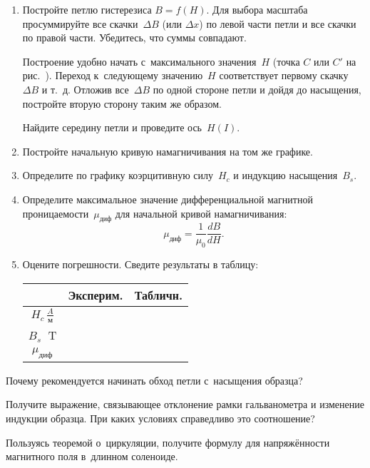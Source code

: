 \begin{lab:task}
\begin{enumerate}
		\item Постройте петлю гистерезиса $B=f(H)$. Для выбора масштаба просуммируйте все скачки~$\Delta B$ (или $\Delta x$) по левой части
		петли и все скачки по правой части. Убедитесь, что суммы совпадают.

		Построение удобно начать с~максимального значения~$H$ (точка $C$ или $C'$ на рис.~). Переход к~следующему значению~$H$
		соответствует первому скачку~$\Delta B$ и т.~д. Отложив все~$\Delta B$ по одной стороне петли и дойдя до насыщения, постройте
		вторую сторону таким же образом.

		Найдите середину петли и проведите ось~$H(I)$.

		\item Постройте начальную кривую намагничивания на том же графике.

		\item Определите по графику коэрцитивную силу~$H_c$ и индукцию насыщения~$B_s$.

		\item Определите максимальное значение дифференциальной магнитной проницаемости~$\mu_\text{диф}$ для начальной кривой
		намагничивания:
		\begin{equation*}
			\mu_\text{диф}=\frac{1}{\mu_0}\frac{dB}{dH}.
		\end{equation*}

		\item Оцените погрешности. Сведите результаты в таблицу:

		\begin{center}
		\begin{tabular}{|c|c|c|}
		\hline
		&Эксперим.&Табличн.\\
		\hline\hline
		$H_c\,\frac{A}{\text{м}}$& & \\
		$B_s\;$ T & & \\
		$\mu_\text{диф}$ & & \\
		\hline
		\end{tabular}
		\end{center}

	\end{enumerate}

\end{lab:task}

\begin{lab:questions}

	\item Почему рекомендуется начинать обход петли с~насыщения образца?

	\item Получите выражение, связывающее отклонение рамки гальванометра и изменение индукции образца. При каких условиях
	справедливо это соотношение?

	\item Пользуясь теоремой о~циркуляции, получите формулу для напряжённости магнитного поля в~длинном соленоиде.

\end{lab:questions}

